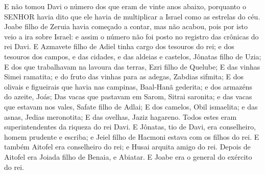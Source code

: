{  E não tomou Davi o número dos que eram de vinte anos abaixo, porquanto o SENHOR havia dito que ele havia de multiplicar a Israel como as estrelas do céu.
  Joabe filho de Zeruia havia começado a contar, mas não acabou, pois por isto veio a ira sobre Israel: e assim o número não foi posto no registro das crônicas do rei Davi.
  E Azmavete filho de Adiel tinha cargo dos tesouros do rei; e dos tesouros dos campos, e das cidades, e das aldeias e castelos, Jônatas filho de Uzia;
  E dos que trabalhavam na lavoura das terras, Ezri filho de Quelube;
  E das vinhas Simei ramatita; e do fruto das vinhas para as adegas, Zabdias sifmita;
  E dos olivais e figueirais que havia nas campinas, Baal-Hanã gederita; e dos armazéns do azeite, Joás;
  Das vacas que pastavam em Sarom, Sitrai saronita; e das vacas que estavam nos vales, Safate filho de Adlai;
  E dos camelos, Obil ismaelita; e das asnas, Jedias meronotita;
  E das ovelhas, Jaziz hagareno. Todos estes eram superintendentes da riqueza do rei Davi.
  E Jônatas, tio de Davi, era conselheiro, homem prudente e escriba; e Jeiel filho de Hacmoni estava com os filhos do rei.
  E também Aitofel era conselheiro do rei; e Husai arquita amigo do rei.
  Depois de Aitofel era Joiada filho de Benaia, e Abiatar. E Joabe era o general do exército do rei.
\par }

